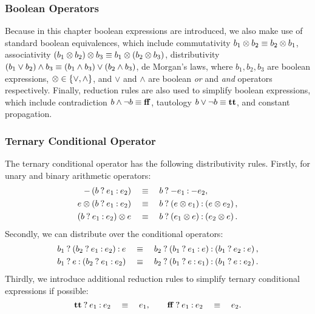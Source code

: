 \subsubsection{Boolean Operators}

Because in this chapter boolean expressions are introduced, we also make
use of standard boolean equivalences, which include commutativity $b_1
\otimes b_2 \equiv b_2 \otimes b_1$, associativity $(b_1 \otimes b_2)
\otimes b_3 \equiv b_1 \otimes (b_2 \otimes b_3)$, distributivity
$(b_1 \vee b_2) \wedge b_3 \equiv (b_1 \wedge b_3) \vee (b_2 \wedge b_3)$,
de Morgan's laws, where $b_1, b_2, b_3$ are boolean expressions, $\otimes
\in \{\vee, \wedge\}$, and $\vee$ and $\wedge$ are boolean \emph{or} and
\emph{and} operators respectively.  Finally, reduction rules are also used
to simplify boolean expressions, which include contradiction $b \wedge \neg
b \equiv \mathbf{ff}$, tautology $b \vee \neg b \equiv \mathbf{tt}$, and constant
propagation.


\subsubsection{Ternary Conditional Operator}

The ternary conditional operator has the following distributivity
rules.  Firstly, for unary and binary arithmetic operators:
\begin{equation}
    \begin{aligned}
        -\left( \select{b}{e_1}{e_2} \right)
        & \quad \eqrel \quad
        \select{b}{-e_1}{-e_2}, \\
        e \opsymbol \left( \select{b}{e_1}{e_2} \right)
        & \quad \eqrel \quad
        \select{b}{%
            \left( e \opsymbol e_1 \right)
        }{%
            \left( e \opsymbol e_2 \right)
        }, \\
        \left( \select{b}{e_1}{e_2} \right) \opsymbol e
        & \quad \eqrel \quad
        \select{b}{%
            \left( e_1 \opsymbol e \right)
        }{%
            \left( e_2 \opsymbol e \right)
        }.
    \end{aligned}
\end{equation}
Secondly, we can distribute over the conditional operators:
\begin{equation}
    \begin{aligned}
        \select{b_1}{\left(\select{b_2}{e_1}{e_2}\right)}{e}
        & \quad \eqrel \quad
        \select{b_2}{%
            \left(\select{b_1}{e_1}{e}\right)}{%
            \left(\select{b_1}{e_2}{e}\right)}, \\
        \select{b_1}{e}{\left(\select{b_2}{e_1}{e_2}\right)}
        & \quad \eqrel \quad
        \select{b_2}{%
            \left(\select{b_1}{e}{e_1}\right)}{%
            \left(\select{b_1}{e}{e_2}\right)}.
    \end{aligned}
\end{equation}
Thirdly, we introduce additional reduction rules to simplify ternary
conditional expressions if possible:
\begin{equation}
    \mathbf{tt}\mathbin{?} e_1\mathbin{:} e_2 \quad \equiv \quad e_1, \qquad
    \mathbf{ff}\mathbin{?} e_1\mathbin{:} e_2 \quad \equiv \quad e_2.
\end{equation}

